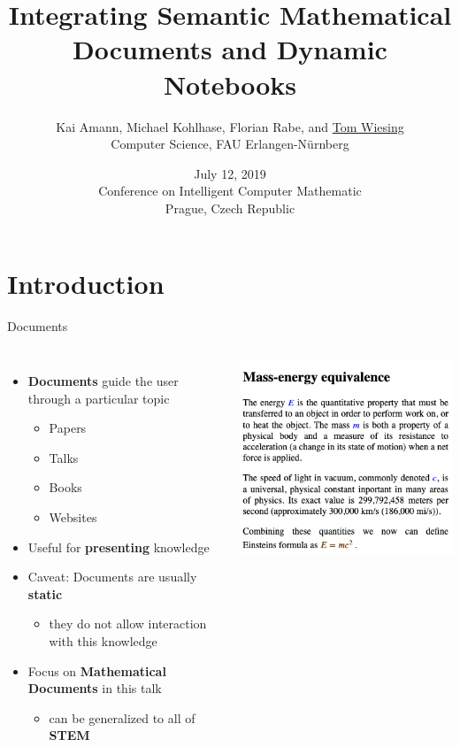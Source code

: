 \documentclass{beamer}
\title[Semantic Documents and Dynamic Notebooks]{Integrating Semantic Mathematical Documents and Dynamic Notebooks}
\author[Tom Wiesing et al.]{Kai Amann, Michael Kohlhase, Florian Rabe, and \underline{Tom Wiesing}\\Computer Science, FAU Erlangen-N{\"u}rnberg}
\date[July 12 2019, CICM Prague]{July 12, 2019\\Conference on Intelligent Computer Mathematic\\Prague, Czech Republic}
\begin{document}
    \frame{\titlepage}
    
    \section{Introduction}

    \begin{frame}{Documents}
        \begin{columns}
            \begin{itemize}
                \item \textbf{Documents} guide the user through a particular topic
                \begin{itemize}
                    \item Papers
                    \item Talks
                    \item Books
                    \item Websites
                \end{itemize}
                \item Useful for \textbf{presenting} knowledge
                \item Caveat: Documents are usually \textbf{static}
                \begin{itemize}
                    \item they do not allow interaction with this knowledge
                \end{itemize}
                \item Focus on \textbf{Mathematical Documents} in this talk
                \begin{itemize}
                    \item can be generalized to all of \textbf{STEM}
                \end{itemize}
            \end{itemize}
            \includegraphics[scale=0.25]{images/doc}
        \end{columns}
    \end{frame}
\end{document}
